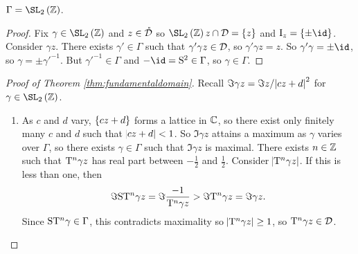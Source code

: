 \begin{corollary}
$ \Gamma = \SL_2\br{\ZZ} $.
\end{corollary}

\begin{proof}
Fix $ \gamma \in \SL_2\br{\ZZ} $ and $ z \in \mathring{\mathcal{D}} $ so $ \SL_2\br{\ZZ}z \cap \DDD = \cbr{z} $ and $ \I_z = \cbr{\pm\id} $. Consider $ \gamma z $. There exists $ \gamma' \in \Gamma $ such that $ \gamma'\gamma z \in \mathcal{D} $, so $ \gamma'\gamma z = z $. So $ \gamma'\gamma = \pm\id $, so $ \gamma = \pm\gamma'^{-1} $. But $ \gamma'^{-1} \in \Gamma $ and $ -\id = \S^2 \in \Gamma $, so $ \gamma \in \Gamma $.
\end{proof}

\pagebreak

\begin{proof}[Proof of Theorem \ref{thm:fundamentaldomain}]
Recall $ \Im \gamma z = \Im z / \abs{cz + d}^2 $ for $ \gamma \in \SL_2\br{\ZZ} $.
\begin{enumerate}
\item As $ c $ and $ d $ vary, $ \cbr{cz + d} $ forms a lattice in $ \mathbb{C} $, so there exist only finitely many $ c $ and $ d $ such that $ \abs{cz + d} < 1 $. So $ \Im \gamma z $ attains a maximum as $ \gamma $ varies over $ \Gamma $, so there exists $ \gamma \in \Gamma $ such that $ \Im \gamma z $ is maximal. There exists $ n \in \mathbb{Z} $ such that $ \mathrm{T}^n\gamma z $ has real part between $ -\tfrac{1}{2} $ and $ \tfrac{1}{2} $. Consider $ \abs{\mathrm{T}^n\gamma z} $. If this is less than one, then
$$ \Im \mathrm{S}\mathrm{T}^n\gamma z = \Im \dfrac{-1}{\mathrm{T}^n\gamma z} > \Im \mathrm{T}^n\gamma z = \Im \gamma z. $$
Since $ \mathrm{S}\mathrm{T}^n\gamma \in \Gamma $, this contradicts maximality so $ \abs{\mathrm{T}^n\gamma z} \ge 1 $, so $ \mathrm{T}^n\gamma z \in \mathcal{D} $.
\end{enumerate}
\end{proof}

